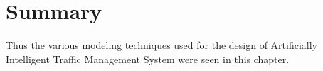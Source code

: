 \documentclass[openany,12pt]{report}
\begin{document}

	
	\section{Summary}
	\hspace*{0.5in}Thus the various modeling techniques used for the design of Artificially Intelligent Traffic Management System were seen in this chapter.
	
\end{document}
